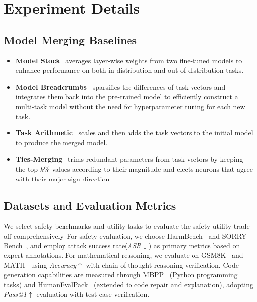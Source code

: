
\appendix

\newpage
\section{Experiment Details}

\subsection{Model Merging Baselines}
\label{sec:appendix_baselines}
\begin{itemize}
    \item \textbf{Model Stock}~\cite{modelstock} averages layer-wise weights from two fine-tuned models to enhance performance on both in-distribution and out-of-distribution tasks.
    \item \textbf{Model Breadcrumbs}~\cite{breadcrumbs} sparsifies the differences of task vectors and integrates them back into the pre-trained model to efficiently construct a multi-task model without the need for hyperparameter tuning for each new task.
    \item \textbf{Task Arithmetic}~\cite{ilharco2023editing} scales and then adds the task vectors to the initial model to produce the merged model.
    \item \textbf{Ties-Merging}~\cite{tiesmerging} trims redundant parameters from task vectors by keeping the top-$k\%$ values according to their magnitude and elects neurons that agree with their major sign direction.
\end{itemize}

\subsection{Datasets and Evaluation Metrics}
\label{sec:appendix_dataset}
We select safety benchmarks and utility tasks to evaluate the safety-utility trade-off comprehensively. For safety evaluation, we choose HarmBench~\cite{harmbench} and SORRY-Bench~\cite{xie2024sorrybench}, and employ attack success rate(\textit{ASR}$\downarrow$) as primary metrics based on expert annotations. For mathematical reasoning, we evaluate on GSM8K~\cite{gsm8k} and MATH~\cite{hendrycksmath2021} using \textit{Accuracy}$\uparrow$ with chain-of-thought reasoning verification. Code generation capabilities are measured through MBPP~\cite{mbpp} (Python programming tasks) and HumanEvalPack~\cite{humanevalpack} (extended to code repair and explanation), adopting \textit{Pass@1}$\uparrow$ evaluation with test-case verification.

